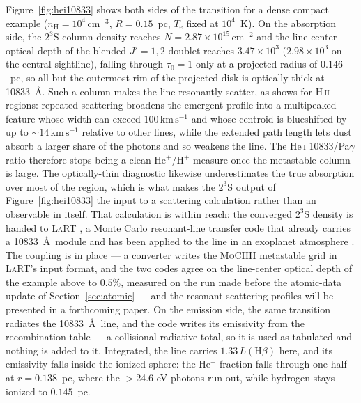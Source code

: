 \documentclass[twocolumn,linenumbers]{aastex702}
\newcommand{\MoCHII}{\textsc{MoCHII}}
\newcommand{\HII}{H\,\textsc{ii}}
\newcommand{\Te}{T_{\mathrm{e}}}
\newcommand{\nH}{n_{\mathrm{H}}}
\begin{document}
Figure~\ref{fig:hei10833} shows both sides of the transition for a dense
compact example ($\nH = 10^4\,\mathrm{cm^{-3}}$, $R = 0.15$~pc, $\Te$ fixed
at $10^4$~K).  On the absorption side, the $2^3$S column density reaches
$N = 2.87\times10^{15}\,\mathrm{cm^{-2}}$ and the line-center optical depth of
the blended $J' = 1, 2$ doublet reaches $3.47\times10^{3}$ ($2.98\times10^{3}$
on the central sightline), falling through $\tau_0 = 1$ only at a projected
radius of $0.146$~pc, so all but the outermost rim of the projected disk is optically
thick at 10833~\AA.  Such a column makes the line resonantly scatter, as
\citet{draine2026} shows for \HII{} regions: repeated scattering broadens the
emergent profile into a multipeaked feature whose width can exceed
$100\,\mathrm{km\,s^{-1}}$ and whose centroid is blueshifted by up to
$\sim$$14\,\mathrm{km\,s^{-1}}$ relative to other lines, while the extended
path length lets dust absorb a larger share of the photons and so weakens the
line.  The He\,\textsc{i} 10833/Pa$\gamma$ ratio therefore stops being a clean
He$^{+}$/H$^{+}$ measure once the metastable column is large.  The
optically-thin diagnostic likewise underestimates the true absorption over
most of the region, which is what makes the $2^3$S output of
Figure~\ref{fig:hei10833} the input to a scattering calculation rather than an
observable in itself.  That calculation is within reach: the converged $2^3$S
density is handed to \textsc{LaRT}
\citep{seon2020,seon2022,seon2024}, a Monte Carlo resonant-line transfer code
that already carries a 10833~\AA\ module and has been applied to the line in
an exoplanet atmosphere \citep{yan2022}.  The coupling is in place --- a
converter writes the \MoCHII{} metastable grid in \textsc{LaRT}'s input
format, and the two codes agree on the line-center optical depth of the
example above to $0.5\%$, measured on the run made before the atomic-data
update of Section~\ref{sec:atomic} --- and the resonant-scattering profiles will be
presented in a forthcoming paper.  On the
emission side, the same
transition radiates the 10833~\AA\ line, and the code writes its emissivity
from the \citet{porter2012} recombination table --- a collisional-radiative
total, so it is used as tabulated and nothing is added to it.  Integrated, the
line carries $1.33\,L(\mathrm{H}\beta)$ here, and its emissivity falls
inside the ionized sphere: the He$^{+}$ fraction falls through one half at
$r = 0.138$~pc, where the $>$24.6-eV photons run out, while hydrogen stays
ionized to $0.145$~pc.
\end{document}
